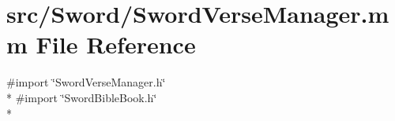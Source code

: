 \hypertarget{_sword_verse_manager_8mm}{\section{src/\-Sword/\-Sword\-Verse\-Manager.mm File Reference}
\label{_sword_verse_manager_8mm}
}
{\ttfamily \#import \char`\"{}Sword\-Verse\-Manager.\-h\char`\"{}}\\*
{\ttfamily \#import \char`\"{}Sword\-Bible\-Book.\-h\char`\"{}}\\*
